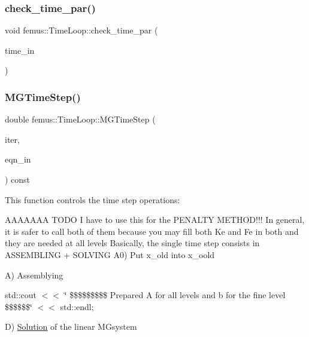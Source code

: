 \subsubsection{\texorpdfstring{check\+\_\+time\+\_\+par()}{check\_time\_par()}}
{\footnotesize\ttfamily void femus\+::\+Time\+Loop\+::check\+\_\+time\+\_\+par (\begin{DoxyParamCaption}\item[{\mbox{\hyperlink{classfemus_1_1_femus_input_parser}{Femus\+Input\+Parser}}$<$ double $>$ \&}]{time\+\_\+in }\end{DoxyParamCaption})\hspace{0.3cm}{\ttfamily [static]}}

\mbox{\label{classfemus_1_1_time_loop_a3ec24f18fc745fde4e5ac0a2c2da094f}} 
\subsubsection{\texorpdfstring{M\+G\+Time\+Step()}{MGTimeStep()}}
{\footnotesize\ttfamily double femus\+::\+Time\+Loop\+::\+M\+G\+Time\+Step (\begin{DoxyParamCaption}\item[{const \mbox{\hyperlink{_typedefs_8hpp_a91ad9478d81a7aaf2593e8d9c3d06a14}{uint}}}]{iter,  }\item[{\mbox{\hyperlink{classfemus_1_1_system_two}{System\+Two}} $\ast$}]{eqn\+\_\+in }\end{DoxyParamCaption}) const}



This function controls the time step operations\+: 

A\+A\+A\+A\+A\+AA T\+O\+DO I have to use this for the P\+E\+N\+A\+L\+TY M\+E\+T\+H\+O\+D!!! In general, it is safer to call both of them because you may fill both Ke and Fe in both and they are needed at all levels Basically, the single time step consists in A\+S\+S\+E\+M\+B\+L\+I\+NG + S\+O\+L\+V\+I\+NG A0) Put x\+\_\+old into x\+\_\+oold

A) Assemblying

std\+::cout $<$$<$ \char`\"{} \$\$\$\$\$\$\$\$\$ Prepared A for all levels and b for the fine level \$\$\$\$\$\$\char`\"{} $<$$<$ std\+::endl;

D) \mbox{\hyperlink{classfemus_1_1_solution}{Solution}} of the linear M\+Gsystem

